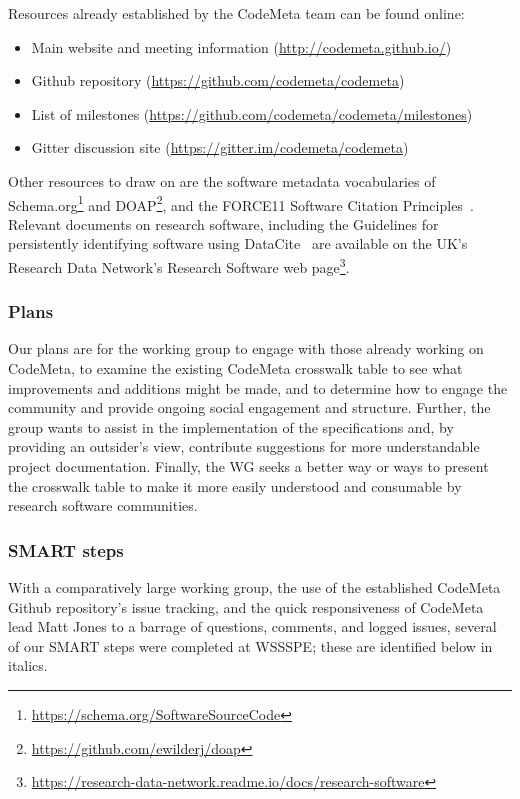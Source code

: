 Resources already established by the CodeMeta team can be found online: 

\begin{itemize}
\item Main website and meeting information (\url{http://codemeta.github.io/})
\item Github repository (\url{https://github.com/codemeta/codemeta})
\item List of milestones (\url{https://github.com/codemeta/codemeta/milestones})
\item Gitter discussion site (\url{https://gitter.im/codemeta/codemeta})
\end {itemize}

Other resources to draw on are the software metadata vocabularies of Schema.org\footnote{\url{https://schema.org/SoftwareSourceCode}} and DOAP\footnote{\url{https://github.com/ewilderj/doap}}, and the FORCE11 Software Citation Principles~\cite{Smith:2016sc}. Relevant documents on research software, including the Guidelines for persistently identifying software using DataCite~\cite{Gent2015} are available on the UK's Research Data Network's Research Software web page\footnote{\url{https://research-data-network.readme.io/docs/research-software}}.

\subsubsection{Plans}

Our plans are for the working group to engage with those already working on CodeMeta, to examine the existing CodeMeta crosswalk table to see what improvements and additions might be made, and to determine how to engage the community and provide ongoing social engagement and structure. Further, the group wants to assist in the implementation of the specifications and, by providing an outsider's view, contribute suggestions for more understandable project documentation. Finally, the WG seeks a better way or ways to present the crosswalk table to make it more easily understood and consumable by research software communities. 

\subsubsection{SMART steps}

With a comparatively large working group, the use of the established CodeMeta Github repository's issue tracking, and the quick responsiveness of CodeMeta lead Matt Jones to a barrage of questions, comments, and logged issues, several of our SMART steps were completed at WSSSPE; these are identified below in italics.

